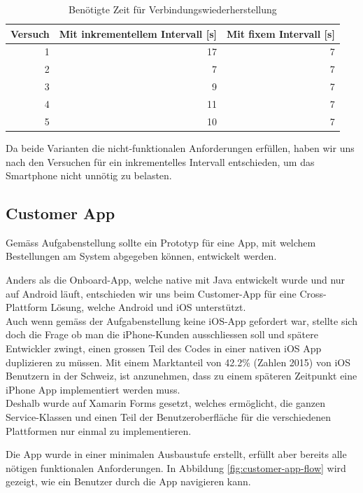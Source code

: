 \begin{table}
	
	\centering
	\begin{tabular}{|r|r|r|}
		\hline
		\textbf{Versuch} & \textbf{Mit inkrementellem Intervall [s] } & \textbf{Mit fixem Intervall [s]} \\
		\hline
		1 & 17 & 7 \\
		2 &	7 & 7 \\
		3 & 9 & 7 \\
 		4 & 11 & 7 \\
		5 & 10 & 7 \\
		\hline
	\end{tabular}
	\caption{Benötigte Zeit für Verbindungswiederherstellung}
	\label{tbl:backoff}
\end{table}

Da beide Varianten die nicht-funktionalen Anforderungen erfüllen, haben wir uns nach den Versuchen für ein inkrementelles Intervall entschieden, um das Smartphone nicht unnötig zu belasten.

\subsection{Customer App}
Gemäss Aufgabenstellung sollte ein Prototyp für eine App, mit welchem Bestellungen am System abgegeben können, entwickelt werden.

Anders als die Onboard-App, welche native mit Java entwickelt wurde und nur auf Android läuft, entschieden wir uns beim Customer-App für eine Cross-Plattform Lösung, welche Android und iOS unterstützt. \\

Auch wenn gemäss der Aufgabenstellung keine iOS-App gefordert war, stellte sich doch die Frage ob man die iPhone-Kunden ausschliessen soll und spätere Entwickler zwingt, einen grossen Teil des Codes in einer nativen iOS App duplizieren zu müssen. Mit einem Marktanteil von 42.2\% (Zahlen 2015) \cite{ios-user} von iOS Benutzern in der Schweiz, ist anzunehmen, dass zu einem späteren Zeitpunkt eine iPhone App implementiert werden muss.\\

Deshalb wurde auf Xamarin Forms gesetzt, welches ermöglicht, die ganzen Service-Klassen und einen Teil der Benutzeroberfläche für die verschiedenen Plattformen nur einmal zu implementieren.

Die App wurde in einer minimalen Ausbaustufe erstellt, erfüllt aber bereits alle nötigen funktionalen Anforderungen. In Abbildung \ref{fig:customer-app-flow} wird gezeigt, wie ein Benutzer durch die App navigieren kann. 

